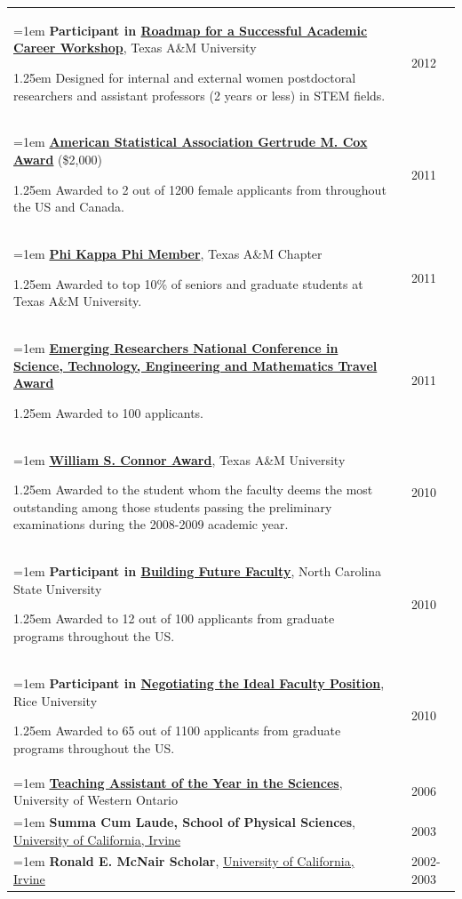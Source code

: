 \documentclass[12pt]{article}
\makeatletter
\newcounter{myCounter}
\newcommand*{\myCounterLast}{%
  \zref@extractdefault{LastPage}{myCounter}{0}%
}
\renewcommand*{\themyCounter}{%
  \@arabic{\numexpr\myCounterLast+1-\value{myCounter}\relax}%
}
\newcommand{\removespace}{\vspace{-2.5ex}}
\def\bam{\begin{addmargin}[1em]{1.25em}}
\def\eam{\end{addmargin}}
\newcommand{\mybold}[1]{{\bf#1}}
\def\ben{\newline\bam\removespace}
\def\een{\removespace\eam}
\def\myhang{\hangindent=1em
\hangafter=1}
\makeatother
\begin{document}
\begin{longtable}{@{\stepcounter{myCounter}
\themyCounter.\hspace*{\tabcolsep}}p{12cm} p{0cm} l}
%
%
\myhang
\mybold{Participant in  \href{http://advance.tamu.edu/roadmap_candidate.html}{Roadmap for a Successful Academic Career Workshop}}, Texas A\&M University  
\ben
Designed for internal and external women postdoctoral researchers and assistant professors (2 years or less) in STEM fields.
\een
&& 2012\\
%
%
\myhang
 \mybold{\href{http://www.amstat.org/education/coxscholarship.cfm}{American Statistical Association Gertrude M. Cox Award}} (\$2,000)  
\ben
Awarded to 2 out of 1200 female applicants from throughout the US and Canada.
\een
&& 2011\\
%
%
\myhang
 \mybold{\href{http://www.phikappaphi.org/}{Phi Kappa Phi Member}}, Texas A\&M Chapter 
\ben
 Awarded to top 10\% of seniors and graduate students at Texas A\&M University.\een
&& 2011\\
%
%
\myhang
\mybold{\href{http://www.emerging-researchers.org/}{Emerging Researchers National Conference in Science, Technology, Engineering and Mathematics Travel Award}} 
\ben
Awarded to 100 applicants.
\een
&& 2011\\
%
%
\myhang 
 \mybold{\href{http://www.stat.tamu.edu/}{William S. Connor Award}}, Texas A\&M University 
\ben
 Awarded to the student whom the faculty deems the most outstanding among those students passing the preliminary examinations during the 2008-2009 academic year.
\een
&& 2010\\
%
%
\myhang
 \mybold{Participant in \href{http://www.ncsu.edu/diversity/faculty_staff/BuildingFutureFacultyHome.php}{Building Future Faculty}},  North Carolina State University
\ben
Awarded to 12 out of 100 applicants from graduate programs throughout the US.
\een
 &&2010\\
%
%
\myhang
\mybold{Participant in \href{http://advance.rice.edu/negotiatingtheidealfacultyposition}{Negotiating the Ideal Faculty Position}}, Rice University
\ben
Awarded to 65 out of 1100 applicants from graduate programs throughout the US.
\een
 &&2010\\
%
%
\myhang
 \mybold{\href{http://www.uwo.ca}{Teaching Assistant of the Year in the Sciences}}, University of Western Ontario  \hfill&& 2006\\
%
%
\myhang
\mybold{Summa Cum Laude, School of Physical Sciences}, \href{http://www.uci.edu}{University of California, Irvine} && 2003\\
%
%
\myhang
\mybold{Ronald E. McNair Scholar}, \href{http://www.uci.edu}{University of California, Irvine} && 2002-2003\\
%

\end{longtable}
\end{document}
